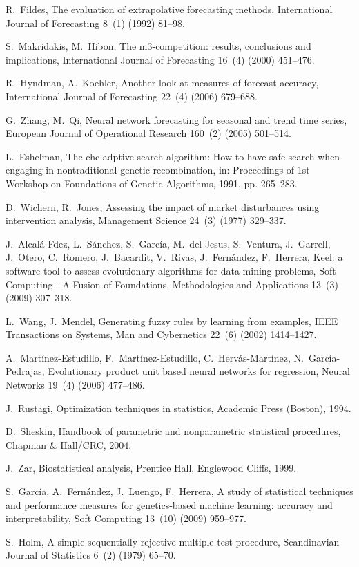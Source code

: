 \documentclass[runningheads]{llncs}
\begin{document}
\begin{thebibliography}{x}
R.~Fildes, The evaluation of extrapolative forecasting methods, International
  Journal of Forecasting 8~(1) (1992) 81--98.

S.~Makridakis, M.~Hibon, The m3-competition: results, conclusions and
  implications, International Journal of Forecasting 16~(4) (2000) 451--476.

R.~Hyndman, A.~Koehler, Another look at measures of forecast accuracy,
  International Journal of Forecasting 22~(4) (2006) 679--688.

G.~Zhang, M.~Qi, Neural network forecasting for seasonal and trend time series,
  European Journal of Operational Research 160~(2) (2005) 501--514.

L.~Eshelman, The chc adptive search algorithm: How to have safe search when
  engaging in nontraditional genetic recombination, in: Proceedings of 1st
  Workshop on Foundations of Genetic Algorithms, 1991, pp. 265--283.

D.~Wichern, R.~Jones, Assessing the impact of market disturbances using
  intervention analysis, Management Science 24~(3) (1977) 329--337.

J.~Alcal\'a-Fdez, L.~S\'anchez, S.~Garc\'{i}a, M.~del Jesus, S.~Ventura,
  J.~Garrell, J.~Otero, C.~Romero, J.~Bacardit, V.~Rivas, J.~Fern\'andez,
  F.~Herrera, Keel: a software tool to assess evolutionary algorithms for data
  mining problems, Soft Computing - A Fusion of Foundations, Methodologies and
  Applications 13~(3) (2009) 307--318.

L.~Wang, J.~Mendel, Generating fuzzy rules by learning from examples, IEEE
  Transactions on Systems, Man and Cybernetics 22~(6) (2002) 1414--1427.

A.~Mart\'{i}nez-Estudillo, F.~Mart\'{i}nez-Estudillo, C.~Herv\'as-Mart\'{i}nez,
  N.~Garc\'{i}a-Pedrajas, Evolutionary product unit based neural networks for
  regression, Neural Networks 19~(4) (2006) 477--486.

J.~Rustagi, Optimization techniques in statistics, Academic Press (Boston),
  1994.

D.~Sheskin, Handbook of parametric and nonparametric statistical procedures,
  Chapman \& Hall/CRC, 2004.

J.~Zar, Biostatistical analysis, Prentice Hall, Englewood Cliffs, 1999.

S.~Garc\'{i}a, A.~Fern\'andez, J.~Luengo, F.~Herrera, A study of statistical
  techniques and performance measures for genetics-based machine learning:
  accuracy and interpretability, Soft Computing 13~(10) (2009) 959--977.

S.~Holm, A simple sequentially rejective multiple test procedure, Scandinavian
  Journal of Statistics 6~(2) (1979) 65--70. 


\end{thebibliography}

%
\end{document}
